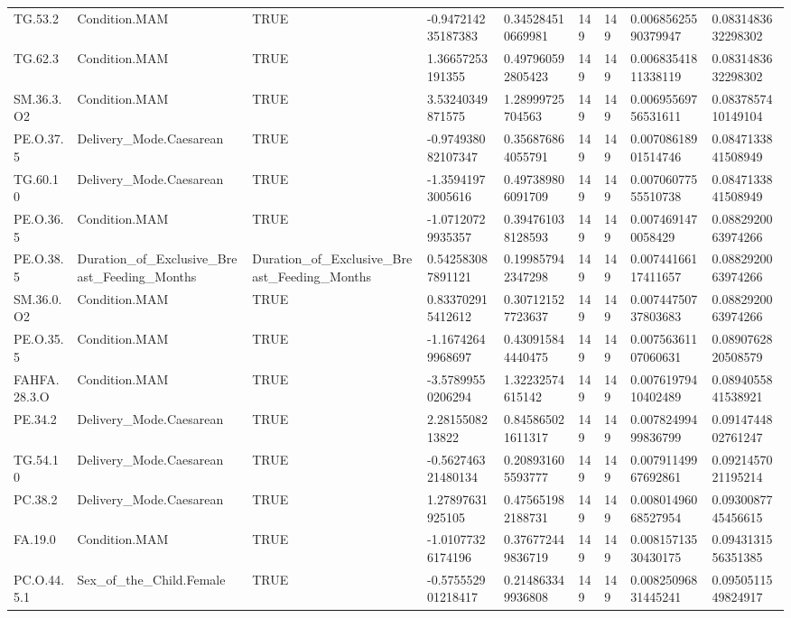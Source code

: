 \begin{longtable}{lllllllll}
TG.53.2 & Condition.MAM & TRUE & -0.947214235187383 & 0.345284510669981 & 149 & 149 & 0.00685625590379947 & 0.0831483632298302 \\
TG.62.3 & Condition.MAM & TRUE & 1.36657253191355 & 0.497960592805423 & 149 & 149 & 0.00683541811338119 & 0.0831483632298302 \\
SM.36.3.O2 & Condition.MAM & TRUE & 3.53240349871575 & 1.28999725704563 & 149 & 149 & 0.00695569756531611 & 0.0837857410149104 \\
PE.O.37.5 & Delivery\_Mode.Caesarean & TRUE & -0.974938082107347 & 0.356876864055791 & 149 & 149 & 0.00708618901514746 & 0.0847133841508949 \\
TG.60.10 & Delivery\_Mode.Caesarean & TRUE & -1.35941973005616 & 0.497389806091709 & 149 & 149 & 0.00706077555510738 & 0.0847133841508949 \\
PE.O.36.5 & Condition.MAM & TRUE & -1.07120729935357 & 0.394761038128593 & 149 & 149 & 0.0074691470058429 & 0.0882920063974266 \\
PE.O.38.5 & Duration\_of\_Exclusive\_Breast\_Feeding\_Months & Duration\_of\_Exclusive\_Breast\_Feeding\_Months & 0.542583087891121 & 0.199857942347298 & 149 & 149 & 0.00744166117411657 & 0.0882920063974266 \\
SM.36.0.O2 & Condition.MAM & TRUE & 0.833702915412612 & 0.307121527723637 & 149 & 149 & 0.00744750737803683 & 0.0882920063974266 \\
PE.O.35.5 & Condition.MAM & TRUE & -1.16742649968697 & 0.430915844440475 & 149 & 149 & 0.00756361107060631 & 0.0890762820508579 \\
FAHFA.28.3.O & Condition.MAM & TRUE & -3.57899550206294 & 1.32232574615142 & 149 & 149 & 0.00761979410402489 & 0.0894055841538921 \\
PE.34.2 & Delivery\_Mode.Caesarean & TRUE & 2.2815508213822 & 0.845865021611317 & 149 & 149 & 0.00782499499836799 & 0.0914744802761247 \\
TG.54.10 & Delivery\_Mode.Caesarean & TRUE & -0.562746321480134 & 0.208931605593777 & 149 & 149 & 0.00791149967692861 & 0.0921457021195214 \\
PC.38.2 & Delivery\_Mode.Caesarean & TRUE & 1.27897631925105 & 0.475651982188731 & 149 & 149 & 0.00801496068527954 & 0.0930087745456615 \\
FA.19.0 & Condition.MAM & TRUE & -1.01077326174196 & 0.376772449836719 & 149 & 149 & 0.00815713530430175 & 0.0943131556351385 \\
PC.O.44.5.1 & Sex\_of\_the\_Child.Female & TRUE & -0.575552901218417 & 0.214863349936808 & 149 & 149 & 0.00825096831445241 & 0.0950511549824917 \\

\end{longtable}
